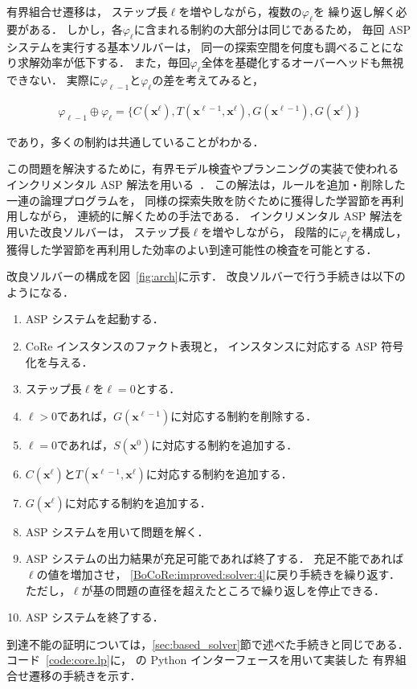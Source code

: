 有界組合せ遷移は，
ステップ長$\ell$を増やしながら，複数の$\varphi_\ell$を
繰り返し解く必要がある．
しかし，各$\varphi_\ell$に含まれる制約の大部分は同じであるため，
毎回 ASP システムを実行する基本ソルバーは，
同一の探索空間を何度も調べることになり求解効率が低下する．
また，毎回$\varphi_\ell$全体を基礎化するオーバーヘッドも無視できない．
実際に$\varphi_{\ell -1}$と$\varphi_{\ell}$の差を考えてみると，
\begin{adjustvboxheight}
\begin{align*}
  \varphi_{\ell -1} \oplus \varphi_{\ell} = 
    \{C(\bm{x}^{\ell}), T(\bm{x}^{\ell -1}, 
    \bm{x}^{\ell}), G(\bm{x}^{\ell -1}), G(\bm{x}^{\ell})\}
\end{align*}
\end{adjustvboxheight}
であり，多くの制約は共通していることがわかる．

この問題を解決するために，有界モデル検査やプランニングの実装で使われる
インクリメンタル ASP 解法を用いる~\cite{GebserKKS19}．
この解法は，ルールを追加・削除した一連の論理プログラムを，
同様の探索失敗を防ぐために獲得した学習節を再利用しながら，
連続的に解くための手法である．
インクリメンタル ASP 解法を用いた改良ソルバーは，
ステップ長$\ell$を増やしながら，
段階的に$\varphi_\ell$を構成し，
獲得した学習節を再利用した効率のよい到達可能性の検査を可能とする．


改良ソルバーの構成を図~\ref{fig:arch}に示す．
改良ソルバーで行う手続きは以下のようになる．
\begin{enumerate}
  \item ASP システムを起動する．
  \item CoRe インスタンスのファクト表現と，
        インスタンスに対応する ASP 符号化を与える．
  \item ステップ長$\ell$を$\ell=0$とする．
  \item \label{BoCoRe:improved:solver:4}
    $\ell > 0$であれば，$G(\bm{x}^{\ell -1})$に対応する制約を削除する．
  \item \label{BoCoRe:improved:solver:5}
    $\ell=0$であれば，$S(\bm{x}^0)$に対応する制約を追加する．
  \item \label{BoCoRe:improved:solver:6}
    $C(\bm{x}^{\ell})$と$T(\bm{x}^{\ell -1}, \bm{x}^{\ell})$に対応する制約を追加する．
  \item \label{BoCoRe:improved:solver:7}
    $G(\bm{x}^{\ell})$に対応する制約を追加する．
  \item ASP システムを用いて問題を解く．
  \item ASP システムの出力結果が充足可能であれば終了する．
        充足不能であれば$\ell$の値を増加させ，
        \ref{BoCoRe:improved:solver:4}に戻り手続きを繰り返す．
        ただし，$\ell$が基の問題の直径を超えたところで繰り返しを停止できる．
  \item ASP システムを終了する．
\end{enumerate}
到達不能の証明については，\ref{sec:based_solver}節で述べた手続きと同じである．
コード~\ref{code:core.lp}に，
{\clingo}の Python インターフェースを用いて実装した
有界組合せ遷移の手続きを示す．

